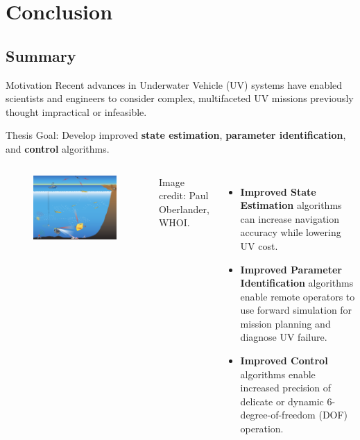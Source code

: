 \section{Conclusion}
\subsection{Summary}


\begin{frame}[t]{Motivation}
  Recent advances in Underwater Vehicle (UV) systems have enabled
  scientists and engineers to consider complex, multifaceted UV
  missions previously thought impractical or infeasible.

\alert{Thesis Goal}: Develop improved
  {\bf state estimation}, {\bf parameter identification}, and
  {\bf control} algorithms.
%    
    \begin{columns}
\begin{center}
      \begin{figure}[htbp]
        \begin{center}
          \includegraphics[width=1.1\textwidth]{./pres/images/Adaptive4}
        \end{center}
      \end{figure}
    \end{center}
{\small Image credit: Paul Oberlander, WHOI.}


  \begin{itemize}
  \item {\bf Improved State Estimation} algorithms can
    increase navigation accuracy while lowering UV cost.
  \item {\bf Improved Parameter Identification} algorithms enable
    remote operators to use forward simulation for mission planning
    and diagnose UV failure.
  \item {\bf Improved Control} algorithms enable increased precision
    of delicate or dynamic 6-degree-of-freedom
    (DOF) operation.
  \end{itemize}


 \end{columns}

\end{frame}


